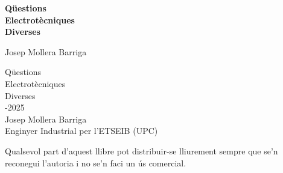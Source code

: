
	      
\begin{titlepage}
	\parbox{18cm}{\fontsize{65pt}{65pt}\sffamily\bfseries\selectfont\color{NavyBlue}%
		Qüestions\\[30pt] Electrotècniques\\[30pt] Diverses\\[75mm]}
	\parbox{18cm}{\fontsize{40}{40}\sffamily\mdseries\selectfont\color{NavyBlue}%
	Josep Mollera Barriga\\}
\end{titlepage}

\cleardoublepage\thispagestyle{empty}
{\fontsize{60pt}{60pt}\selectfont%
	Qüestions\\[25pt]
	Electrotècniques\\[25pt]
	Diverses\\[90pt]}
{\fontsize{40pt}{40pt}-2025 \hspace{5mm}{\Huge(versió 15.0)}\\[85pt]
	Josep Mollera Barriga\\[25pt]}
{\fontsize{25pt}{25pt}\selectfont
	Enginyer Industrial per l'ETSEIB (UPC)}
\vfill
{\fontsize{15pt}{20pt}\selectfont
	\begin{list}{}
		{\setlength{\labelwidth}{7mm} \setlength{\leftmargin}{7mm}\setlength{\labelsep}{2mm}}
		\item[{\faCopyright[regular]}]  Qualsevol part d'aquest llibre  pot  distribuir-se lliurement
		sempre que se’n reconegui l’autoria i no se’n faci un ús comercial.
\end{list}}

